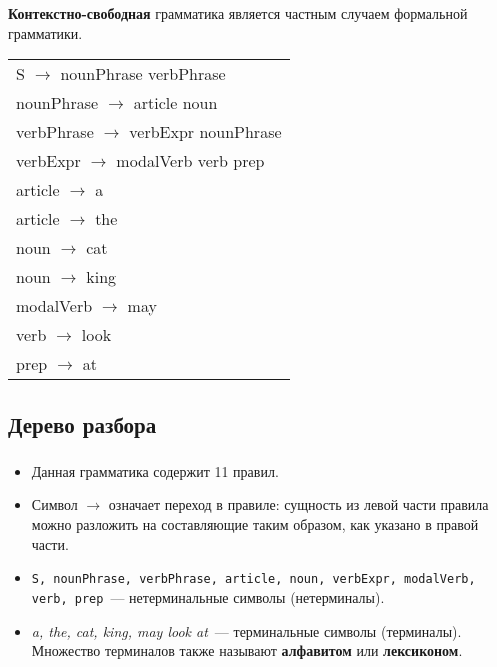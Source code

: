 \begin{frame}

	\frametitle{\insertsection}
	\framesubtitle{\insertsubsection}
	
	\textbf{Контекстно-свободная} грамматика является частным случаем формальной грамматики.
	
	\begin{table}
		\centering
		\begin{tabular}{ l }
			\rowcolor{LightGray} S \(\rightarrow \) nounPhrase verbPhrase \\
			\rowcolor{LightGray} nounPhrase \(\rightarrow \) article noun \\
			\rowcolor{LightGray} verbPhrase \(\rightarrow \) verbExpr nounPhrase \\
			\rowcolor{LightGray} verbExpr \(\rightarrow \) modalVerb verb prep \\
			\rowcolor{LightGray} article \(\rightarrow \) a \\
			\rowcolor{LightGray} article \(\rightarrow \) the \\
			\rowcolor{LightGray} noun \(\rightarrow \) cat \\
			\rowcolor{LightGray} noun \(\rightarrow \) king \\
			\rowcolor{LightGray} modalVerb \(\rightarrow \) may \\
			\rowcolor{LightGray} verb \(\rightarrow \) look \\
			\rowcolor{LightGray} prep \(\rightarrow \) at
		\end{tabular}
	\end{table}

\end{frame}

\subsection{Дерево разбора}

\begin{frame}
	
	\frametitle{\insertsection}
	\framesubtitle{\insertsubsection}
	
	\begin{itemize}
		\item Данная грамматика содержит 11 правил.
		\item Символ \(\rightarrow \) означает переход в правиле: сущность из левой части правила можно разложить на составляющие таким образом, как указано
		в правой части.
		\item \texttt{S, nounPhrase, verbPhrase, article, noun, verbExpr, modalVerb, verb, prep}~--- нетерминальные символы (нетерминалы).
		\item \textit{a, the, cat, king, may look at}~--- терминальные символы (терминалы). Множество терминалов также называют \textbf{алфавитом} или \textbf{лексиконом}.
	\end{itemize}
	
\end{frame}


